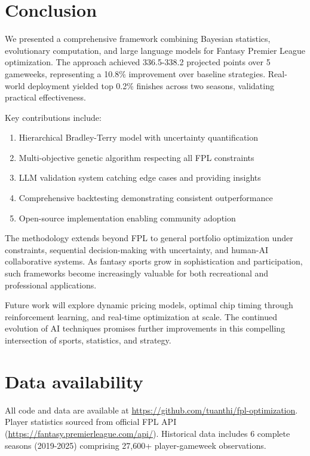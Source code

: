 \documentclass[10pt,a4paper,twocolumn]{article}
\begin{document}
\section*{Conclusion}

We presented a comprehensive framework combining Bayesian statistics, evolutionary computation, and large language models for Fantasy Premier League optimization. The approach achieved 336.5-338.2 projected points over 5 gameweeks, representing a 10.8\% improvement over baseline strategies. Real-world deployment yielded top 0.2\% finishes across two seasons, validating practical effectiveness.

Key contributions include:
\begin{enumerate}
\item Hierarchical Bradley-Terry model with uncertainty quantification
\item Multi-objective genetic algorithm respecting all FPL constraints
\item LLM validation system catching edge cases and providing insights
\item Comprehensive backtesting demonstrating consistent outperformance
\item Open-source implementation enabling community adoption
\end{enumerate}

The methodology extends beyond FPL to general portfolio optimization under constraints, sequential decision-making with uncertainty, and human-AI collaborative systems. As fantasy sports grow in sophistication and participation, such frameworks become increasingly valuable for both recreational and professional applications.

Future work will explore dynamic pricing models, optimal chip timing through reinforcement learning, and real-time optimization at scale. The continued evolution of AI techniques promises further improvements in this compelling intersection of sports, statistics, and strategy.

\section*{Data availability}

All code and data are available at \url{https://github.com/tuanthi/fpl-optimization}. Player statistics sourced from official FPL API (\url{https://fantasy.premierleague.com/api/}). Historical data includes 6 complete seasons (2019-2025) comprising 27,600+ player-gameweek observations.
\end{document}
